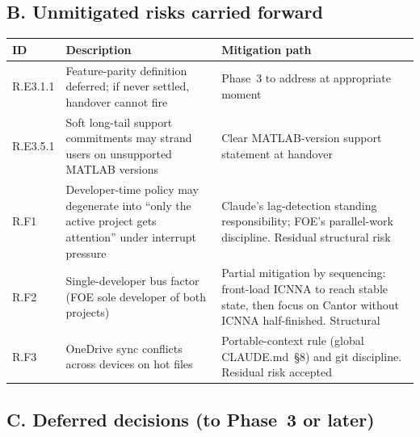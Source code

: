 \documentclass[11pt,a4paper]{article}
\begin{document}
\subsection{B. Unmitigated risks carried forward}

\begin{longtable}{p{2.3cm}p{6.5cm}p{6cm}}
\toprule
\textbf{ID} & \textbf{Description} & \textbf{Mitigation path} \\
\midrule
\endhead
R.E3.1.1 & Feature-parity definition deferred; if never settled, handover cannot fire & Phase~3 to address at appropriate moment \\
R.E3.5.1 & Soft long-tail support commitments may strand users on unsupported MATLAB versions & Clear MATLAB-version support statement at handover \\
R.F1 & Developer-time policy may degenerate into ``only the active project gets attention'' under interrupt pressure & Claude's lag-detection standing responsibility; FOE's parallel-work discipline. Residual structural risk \\
R.F2 & Single-developer bus factor (FOE sole developer of both projects) & Partial mitigation by sequencing: front-load ICNNA to reach stable state, then focus on Cantor without ICNNA half-finished. Structural \\
R.F3 & OneDrive sync conflicts across devices on hot files & Portable-context rule (global CLAUDE.md~§8) and git discipline. Residual risk accepted \\
\bottomrule
\end{longtable}

\subsection{C. Deferred decisions (to Phase~3 or later)}
\end{document}
